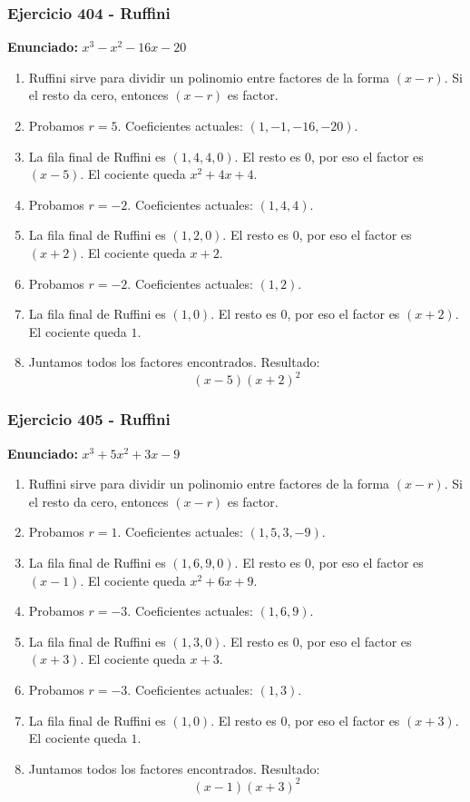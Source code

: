 \documentclass[11pt,a4paper]{article}
\begin{document}
\vspace{0.2cm}
\subsubsection*{Ejercicio 404 - Ruffini}
\textbf{Enunciado:} $ x^{3} - x^{2} - 16 x - 20 $\par
\begin{enumerate}[leftmargin=2em]
\item Ruffini sirve para dividir un polinomio entre factores de la forma \((x-r)\). Si el resto da cero, entonces \((x-r)\) es factor.
\item Probamos \(r=5\). Coeficientes actuales: \((1, -1, -16, -20)\).
\item La fila final de Ruffini es \((1, 4, 4, 0)\). El resto es \(0\), por eso el factor es \((x-5)\). El cociente queda \(x^{2} + 4 x + 4\).
\item Probamos \(r=-2\). Coeficientes actuales: \((1, 4, 4)\).
\item La fila final de Ruffini es \((1, 2, 0)\). El resto es \(0\), por eso el factor es \((x+2)\). El cociente queda \(x + 2\).
\item Probamos \(r=-2\). Coeficientes actuales: \((1, 2)\).
\item La fila final de Ruffini es \((1, 0)\). El resto es \(0\), por eso el factor es \((x+2)\). El cociente queda \(1\).
\item Juntamos todos los factores encontrados. Resultado: \[\boxed{\left(x - 5\right) \left(x + 2\right)^{2}}\]
\end{enumerate}

\vspace{0.2cm}
\subsubsection*{Ejercicio 405 - Ruffini}
\textbf{Enunciado:} $ x^{3} + 5 x^{2} + 3 x - 9 $\par
\begin{enumerate}[leftmargin=2em]
\item Ruffini sirve para dividir un polinomio entre factores de la forma \((x-r)\). Si el resto da cero, entonces \((x-r)\) es factor.
\item Probamos \(r=1\). Coeficientes actuales: \((1, 5, 3, -9)\).
\item La fila final de Ruffini es \((1, 6, 9, 0)\). El resto es \(0\), por eso el factor es \((x-1)\). El cociente queda \(x^{2} + 6 x + 9\).
\item Probamos \(r=-3\). Coeficientes actuales: \((1, 6, 9)\).
\item La fila final de Ruffini es \((1, 3, 0)\). El resto es \(0\), por eso el factor es \((x+3)\). El cociente queda \(x + 3\).
\item Probamos \(r=-3\). Coeficientes actuales: \((1, 3)\).
\item La fila final de Ruffini es \((1, 0)\). El resto es \(0\), por eso el factor es \((x+3)\). El cociente queda \(1\).
\item Juntamos todos los factores encontrados. Resultado: \[\boxed{\left(x - 1\right) \left(x + 3\right)^{2}}\]
\end{enumerate}
\end{document}
